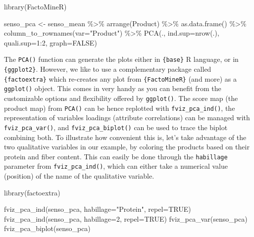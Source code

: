 \documentclass[
]{book}
\newenvironment{Shaded}{\begin{snugshade}}{\end{snugshade}}
\newcommand{\AttributeTok}[1]{\textcolor[rgb]{0.77,0.63,0.00}{#1}}
\newcommand{\ConstantTok}[1]{\textcolor[rgb]{0.00,0.00,0.00}{#1}}
\newcommand{\DecValTok}[1]{\textcolor[rgb]{0.00,0.00,0.81}{#1}}
\newcommand{\FunctionTok}[1]{\textcolor[rgb]{0.00,0.00,0.00}{#1}}
\newcommand{\NormalTok}[1]{#1}
\newcommand{\OtherTok}[1]{\textcolor[rgb]{0.56,0.35,0.01}{#1}}
\newcommand{\SpecialCharTok}[1]{\textcolor[rgb]{0.00,0.00,0.00}{#1}}
\newcommand{\StringTok}[1]{\textcolor[rgb]{0.31,0.60,0.02}{#1}}
\begin{document}
\begin{Shaded}
\begin{Highlighting}[]
\FunctionTok{library}\NormalTok{(FactoMineR)}

\NormalTok{senso\_pca }\OtherTok{\textless{}{-}}\NormalTok{ senso\_mean }\SpecialCharTok{\%\textgreater{}\%} 
  \FunctionTok{arrange}\NormalTok{(Product) }\SpecialCharTok{\%\textgreater{}\%} 
  \FunctionTok{as.data.frame}\NormalTok{() }\SpecialCharTok{\%\textgreater{}\%} 
  \FunctionTok{column\_to\_rownames}\NormalTok{(}\AttributeTok{var=}\StringTok{"Product"}\NormalTok{) }\SpecialCharTok{\%\textgreater{}\%} 
  \FunctionTok{PCA}\NormalTok{(., }\AttributeTok{ind.sup=}\FunctionTok{nrow}\NormalTok{(.), }\AttributeTok{quali.sup=}\DecValTok{1}\SpecialCharTok{:}\DecValTok{2}\NormalTok{, }\AttributeTok{graph=}\ConstantTok{FALSE}\NormalTok{)}
\end{Highlighting}
\end{Shaded}

The \texttt{PCA()} function can generate the plots either in \texttt{\{base\}} R language, or in \texttt{\{ggplot2\}}. However, we like to use a complementary package called \texttt{\{factoextra\}} which re-creates any plot from \texttt{\{FactoMineR\}} (and more) as a \texttt{ggplot()} object. This comes in very handy as you can benefit from the customizable options and flexibility offered by \texttt{ggplot()}.
The score map (the product map) from \texttt{PCA()} can be hence replotted with \texttt{fviz\_pca\_ind()}, the representation of variables loadings (attribute correlations) can be managed with \texttt{fviz\_pca\_var()}, and \texttt{fviz\_pca\_biplot()} can be used to trace the biplot combining both.
To illustrate how convenient this is, let's take advantage of the two qualitative variables in our example, by coloring the products based on their protein and fiber content. This can easily be done through the \texttt{habillage} parameter from \texttt{fviz\_pca\_ind()}, which can either take a numerical value (position) of the name of the qualitative variable.

\begin{Shaded}
\begin{Highlighting}[]
\FunctionTok{library}\NormalTok{(factoextra)}

\FunctionTok{fviz\_pca\_ind}\NormalTok{(senso\_pca, }\AttributeTok{habillage=}\StringTok{"Protein"}\NormalTok{, }\AttributeTok{repel=}\ConstantTok{TRUE}\NormalTok{)}
\FunctionTok{fviz\_pca\_ind}\NormalTok{(senso\_pca, }\AttributeTok{habillage=}\DecValTok{2}\NormalTok{, }\AttributeTok{repel=}\ConstantTok{TRUE}\NormalTok{)}
\FunctionTok{fviz\_pca\_var}\NormalTok{(senso\_pca)}
\FunctionTok{fviz\_pca\_biplot}\NormalTok{(senso\_pca)}
\end{Highlighting}
\end{Shaded}
\end{document}

